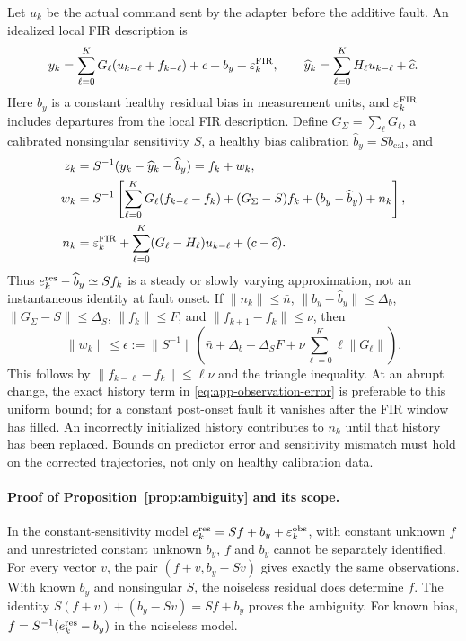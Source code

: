 Let $u_k$ be the actual command sent by the adapter before the additive fault.
An idealized local FIR description is
\begin{equation}
 y_k=\sum_{\ell=0}^{K}G_\ell(u_{k-\ell}+f_{k-\ell})+c+b_y+\varepsilon_k^{\rm FIR},
 \qquad
 \widehat y_k=\sum_{\ell=0}^{K}H_\ell u_{k-\ell}+\widehat c.
 \label{eq:app-fir}
\end{equation}
Here $b_y$ is a constant healthy residual bias in measurement units, and
$\varepsilon_k^{\rm FIR}$ includes departures from the local FIR description. Define
$G_\Sigma=\sum_\ell G_\ell$, a calibrated nonsingular sensitivity $S$, a
healthy bias calibration $\widehat b_y=S b_{\mathrm{cal}}$, and
\begin{align}
 z_k&=S^{-1}(y_k-\widehat y_k-\widehat b_y)=f_k+w_k,
 \label{eq:app-observation}\\
 w_k&=S^{-1}\left[
  \sum_{\ell=0}^{K}G_\ell(f_{k-\ell}-f_k)
  +(G_\Sigma-S)f_k+(b_y-\widehat b_y)+n_k\right],
 \label{eq:app-observation-error}\\
 n_k&=\varepsilon_k^{\rm FIR}+\sum_{\ell=0}^{K}(G_\ell-H_\ell)u_{k-\ell}
       +(c-\widehat c).\nonumber
\end{align}
Thus $e_k^{\rm res}-\widehat b_y\simeq Sf_k$ is a steady or slowly varying approximation, not an
instantaneous identity at fault onset. If $\|n_k\|\le\bar n$,
$\|b_y-\widehat b_y\|\le\Delta_b$,
$\|G_\Sigma-S\|\le\Delta_S$, $\|f_k\|\le F$, and
$\|f_{k+1}-f_k\|\le\nu$, then
\begin{equation}
 \|w_k\|\le\epsilon:={\|S^{-1}\|}
 \left(\bar n+\Delta_b+\Delta_S F+
       \nu\sum_{\ell=0}^{K}\ell\|G_\ell\|\right).
 \label{eq:app-fir-bound}
\end{equation}
This follows by $\|f_{k-\ell}-f_k\|\le\ell\nu$ and the triangle
inequality. At an abrupt change, the exact history term in
\eqref{eq:app-observation-error} is preferable to this uniform bound; for a
constant post-onset fault it vanishes after the FIR window has filled. An
incorrectly initialized history contributes to $n_k$ until that history has
been replaced. Bounds on predictor error and sensitivity mismatch must hold
on the corrected trajectories, not only on healthy calibration data.

\paragraph{Proof of Proposition~\ref{prop:ambiguity} and its scope.}
In the constant-sensitivity model $e_k^{\rm res}=Sf+b_y+\varepsilon_k^{\rm obs}$, with constant unknown
$f$ and unrestricted constant unknown $b_y$, $f$ and $b_y$ cannot be separately
identified. For every vector $v$, the pair $(f+v,b_y-Sv)$ gives exactly the
same observations. With known $b_y$ and nonsingular $S$, the noiseless residual
does determine $f$. The identity $S(f+v)+(b_y-Sv)=Sf+b_y$ proves the ambiguity. For known bias,
$f=S^{-1}(e_k^{\rm res}-b_y)$ in the noiseless model.

